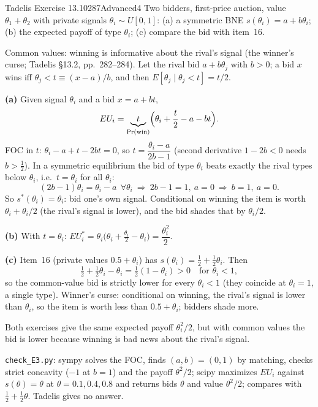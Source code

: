 \begin{exsol}{Tadelis Exercise 13.10}{287}{Advanced}{4}
\asked Two bidders, first-price auction, value $\theta_1+\theta_2$ with private signals
$\theta_i\sim U[0,1]$: (a) a symmetric BNE $s(\theta_i)=a+b\theta_i$; (b) the expected payoff of
type $\theta_i$; (c) compare the bid with item~16.

\method Common values: winning is informative about the rival's signal (the winner's curse;
Tadelis \S13.2, pp.~282--284). Let the rival bid $a+b\theta_j$ with $b>0$; a bid $x$ wins iff
$\theta_j<t\equiv(x-a)/b$, and then $E[\theta_j\mid\theta_j<t]=t/2$.

\solution
\textbf{(a)} Given signal $\theta_i$ and a bid $x=a+bt$,
\[
  EU_i=\underbrace{t}_{\Pr(\text{win})}\Bigl(\theta_i+\frac t2-a-bt\Bigr).
\]
FOC in $t$: $\theta_i-a+t-2bt=0$, so $t=\dfrac{\theta_i-a}{2b-1}$ (second derivative
$1-2b<0$ needs $b>\tfrac12$). In a symmetric equilibrium the bid of type $\theta_i$ beats exactly the
rival types below $\theta_i$, i.e.\ $t=\theta_i$ for all $\theta_i$:
\[
  (2b-1)\theta_i=\theta_i-a\ \ \forall\theta_i\ \Rightarrow\ 2b-1=1,\ a=0\ \Rightarrow\ b=1,\ a=0 .
\]
So $s^*(\theta_i)=\theta_i$: bid one's own signal. Conditional on winning the item is worth
$\theta_i+\theta_i/2$ (the rival's signal is lower), and the bid shades that by $\theta_i/2$.

\textbf{(b)} With $t=\theta_i$: $EU_i^*=\theta_i\bigl(\theta_i+\tfrac{\theta_i}2-\theta_i\bigr)=\dfrac{\theta_i^2}{2}$.

\textbf{(c)} Item~16 (private values $0.5+\theta_i$) has $s(\theta_i)=\tfrac12+\tfrac12\theta_i$. Then
\[
  \tfrac12+\tfrac12\theta_i-\theta_i=\tfrac12(1-\theta_i)>0\quad\text{for }\theta_i<1 ,
\]
so the common-value bid is strictly lower for every $\theta_i<1$ (they coincide at $\theta_i=1$, a
single type). Winner's curse: conditional on winning, the rival's signal is lower than
$\theta_i$, so the item is worth less than $0.5+\theta_i$; bidders shade more.

\interp Both exercises give the same expected payoff $\theta_i^2/2$, but with common values
the bid is lower because winning is bad news about the rival's signal.

\verify \texttt{check\_E3.py}: sympy solves the FOC, finds $(a,b)=(0,1)$ by matching, checks strict
concavity ($-1$ at $b=1$) and the payoff $\theta^2/2$; scipy maximizes $EU_i$ against $s(\theta)=\theta$ at
$\theta=0.1,0.4,0.8$ and returns bids $\theta$ and value $\theta^2/2$; compares with
$\tfrac12+\tfrac12\theta$. Tadelis gives no answer.

\end{exsol}
